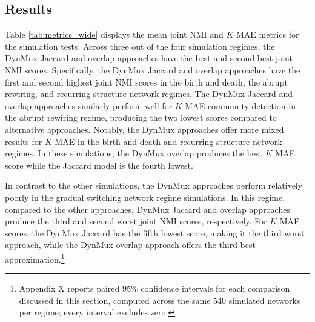 \documentclass[11pt, letterpaper]{article}
\begin{document}
\subsection{Results}
Table \ref{tab:metrics_wide} displays the mean joint NMI and $K$ MAE metrics for the simulation tests. Across three out of the four simulation regimes, the DynMux Jaccard and overlap approaches have the best and second best joint NMI scores. Specifically, the DynMux Jaccard and overlap approaches have the first and second highest joint NMI scores in the birth and death, the abrupt rewiring, and recurring structure network regimes. The DynMux Jaccard and overlap approaches similarly perform well for $K$ MAE community detection in the abrupt rewiring regime, producing the two lowest scores compared to alternative approaches. Notably, the DynMux approaches offer more mixed results for $K$ MAE in the birth and death and recurring structure network regimes. In these simulations, the DynMux overlap produces the best $K$ MAE score while the Jaccard model is the fourth lowest.

In contrast to the other simulations, the DynMux approaches perform relatively poorly in the gradual switching network regime simulations. In this regime, compared to the other approaches, DynMux Jaccard and overlap approaches produce the third and second worst joint NMI scores, respectively. For $K$ MAE scores, the DynMux Jaccard has the fifth lowest score, making it the third worst approach, while the DynMux overlap approach offers the third best approximation.\footnote{Appendix X reports paired 95\% confidence intervals for each comparison discussed in this section, computed across the same 540 simulated networks per regime; every interval excludes zero.}  
\end{document}

